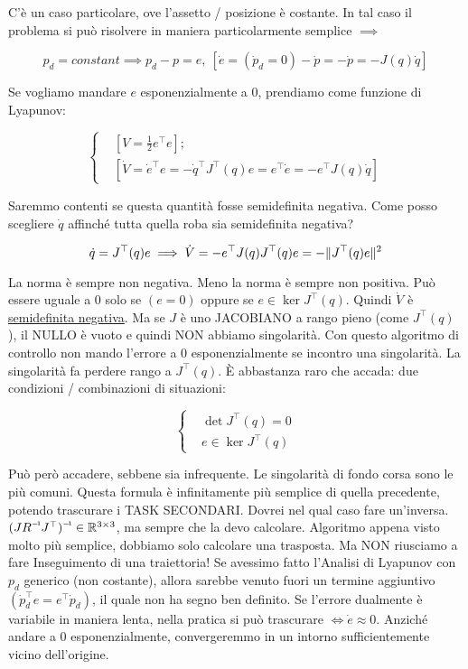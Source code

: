 C'è un caso particolare, ove l'assetto / posizione è costante. In tal caso il problema si può risolvere in maniera particolarmente semplice $\implies$

\[
	p_d=constant\implies p_d-p=e,\ [\dot{e}=(\dot{p}_d=0)-\dot{p}=-\dot{p}=-J(q)\dot{q}]
\]

Se vogliamo mandare $e$ esponenzialmente a 0, prendiamo come funzione di Lyapunov:

\[	
	\left\{
	\begin{aligned}
	&[V=\frac{1}{2}e^\top e];\\
	&[\dot{V}=\dot{e}^\top e= -\dot{q}^\top J^\top(q) e = e^\top\dot{e} = -e^\top J(q)\dot{q}]
	\end{aligned}
	\right.
\]

Saremmo contenti se questa quantità fosse semidefinita negativa. Come posso scegliere $\dot{q}$ affinché tutta quella roba sia semidefinita negativa?

\[
	\dot{q}=J^\top(q)e \implies \dot{V}=-e^\top J(q)J^\top(q)e = -\lVert J^\top(q)e\rVert^2
\]

La norma è sempre non negativa. Meno la norma è sempre non positiva. Può essere uguale a 0 solo se $(e=0)$ oppure se $e\in\ker{J^\top(q)}$. Quindi $\dot{V}$ è \underline{semidefinita negativa}. Ma se $J$ è uno JACOBIANO a rango pieno (come $J^\top(q)$), il NULLO è vuoto e quindi NON abbiamo singolarità. Con questo algoritmo di controllo non mando l'errore a 0 esponenzialmente se incontro una singolarità. La singolarità fa perdere rango a $J^\top(q)$. \`E abbastanza raro che accada: due condizioni / combinazioni di situazioni:

\[
	\left\{
	\begin{aligned}
	&\det{J^\top(q)}=0\\
	&e\in\ker{J^\top(q)}
	\end{aligned}
	\right.
\]

Può però accadere, sebbene sia infrequente. Le singolarità di fondo corsa sono le più comuni. Questa formula è infinitamente più semplice di quella precedente, potendo trascurare i TASK SECONDARI. Dovrei nel qual caso fare un'inversa. $\inv{(J\inv{R}J^\top)}\in\R^{3\times 3}$, ma sempre che la devo calcolare. Algoritmo appena visto molto più semplice, dobbiamo solo calcolare una trasposta. Ma NON riusciamo a fare Inseguimento di una traiettoria! Se avessimo fatto l'Analisi di Lyapunov con $p_d$ generico (non costante), allora sarebbe venuto fuori un termine aggiuntivo $(\dot{p}_d^\top e = e^\top\dot{p}_d)$, il quale non ha segno ben definito. Se l'errore dualmente è variabile in maniera lenta, nella pratica si può trascurare $\iff\dot{e}\approx 0$. Anziché andare a 0 esponenzialmente, convergeremmo in un intorno sufficientemente vicino dell'origine.

